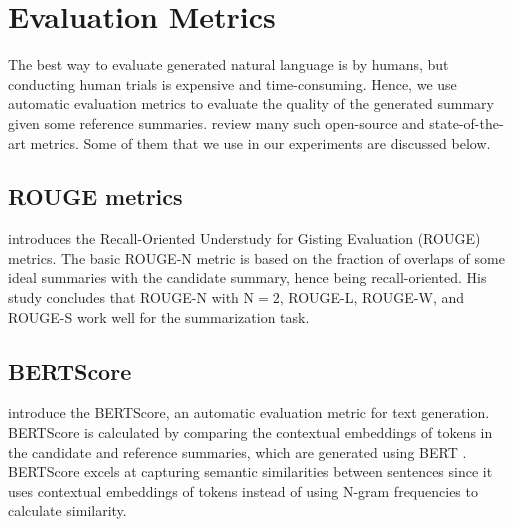 \section{Evaluation Metrics}

The best way to evaluate generated natural language is by humans, but conducting
human trials is expensive and time-consuming.
Hence, we use automatic evaluation metrics to evaluate the quality of the generated
summary given some reference summaries.
\citet{fabbri2021summeval} review many such open-source and state-of-the-art metrics.
Some of them that we use in our experiments are discussed below.


\subsection{ROUGE metrics}

\citet{lin-2004-rouge} introduces the Recall-Oriented Understudy for Gisting
Evaluation (ROUGE) metrics.
The basic ROUGE-N metric is based on the fraction of overlaps of some ideal summaries
with the candidate summary, hence being recall-oriented.
His study concludes that ROUGE-N with $\text{N}=2$, ROUGE-L, ROUGE-W, and ROUGE-S work
well for the summarization task.


\subsection{BERTScore}

\citet{zhang2019bertscore} introduce the BERTScore, an automatic evaluation metric for
text generation.
BERTScore is calculated by comparing the contextual embeddings of tokens in the candidate
and reference summaries, which are generated using BERT \cite{devlin2018bert}.
BERTScore excels at capturing semantic similarities between sentences since it uses
contextual embeddings of tokens instead of using N-gram frequencies to calculate similarity.






